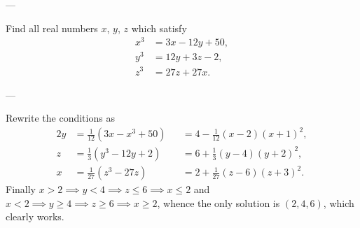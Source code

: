 
---

Find all real numbers $x$, $y$, $z$ which satisfy
\begin{align*}
    x^3&=3x-12y+50,\\
    y^3&=12y+3z-2,\\
    z^3&=27z+27x.
\end{align*}

---

Rewrite the conditions as
\begin{alignat*}2
    y&=\tfrac1{12}(3x-x^3+50)&&=4-\tfrac1{12}(x-2)(x+1)^2,\\
    z&=\tfrac13(y^3-12y+2)&&=6+\tfrac13(y-4)(y+2)^2,\\
    x&=\tfrac1{27}(z^3-27z)&&=2+\tfrac1{27}(z-6)(z+3)^2.
\end{alignat*}
Finally $x>2\implies y<4\implies z\le6\implies x\le2$ and $x<2\implies y\ge4\implies z\ge6\implies x\ge2$, whence the only solution is $(2,4,6)$, which clearly works.
